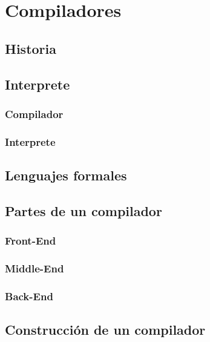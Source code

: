 
\chapter{Compiladores}

\section{Historia}

\section{Interprete}
	\subsection{Compilador}
	\subsection{Interprete}

\section{Lenguajes formales}

\section{Partes de un compilador}

	\subsection{Front-End}
	\subsection{Middle-End}
	\subsection{Back-End}

\section{Construcción de un compilador}



